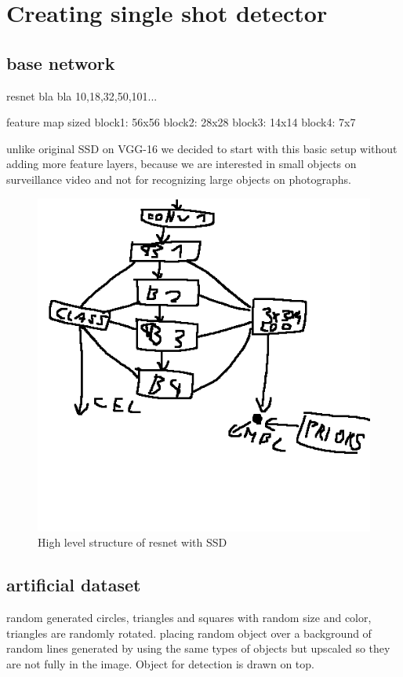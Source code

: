 \chapter{Creating single shot detector}
\label{chapt:improvemnets}

\section{base network}
resnet
bla bla 10,18,32,50,101...

feature map sized
block1: 56x56
block2: 28x28
block3: 14x14
block4: 7x7

unlike original SSD on VGG-16 we decided to start with this basic setup without adding more feature layers, because we are interested in small objects on surveillance video and not for recognizing large objects on photographs.

\begin{figure}
    \centering
    \includegraphics[width=\textwidth]{img/resnet_blocks.png}
    \caption{High level structure of resnet with SSD}
    \label{fig:my_label}
\end{figure}




\section{artificial dataset}
random generated circles, triangles and squares with random size and color, triangles are randomly rotated. placing random object over a background of random lines generated by using the same types of objects but upscaled so they are not fully in the image. Object for detection is drawn on top. 

